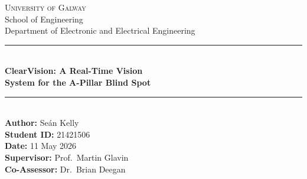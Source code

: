 \documentclass[11pt, a4paper]{report}
\begin{document}
\begin{titlepage}
    \centering
    \vspace*{1.5cm}

    {\Large \textsc{University of Galway}}\\[0.4em]
    {\large School of Engineering}\\[0.3em]
    {\large Department of Electronic and Electrical Engineering}\\[2.8cm]

    \rule{\linewidth}{1pt}\\[0.5em]
    {\LARGE \bfseries ClearVision: A Real-Time Vision\\[0.3em]
    System for the A-Pillar Blind Spot}\\[0.5em]
    \rule{\linewidth}{1pt}\\[2cm]

    {\large \textbf{Author:} Se\'{a}n Kelly}\\[0.4em]
    {\large \textbf{Student ID:} 21421506}\\[0.4em]
    {\large \textbf{Date:} 11 May 2026}\\[0.4em]
    {\large \textbf{Supervisor:} Prof.\ Martin Glavin}\\[0.4em]
    {\large \textbf{Co-Assessor:} Dr.\ Brian Deegan}\\[0.4em]

    \newpage

    \begin{minipage}{0.85\linewidth}
    \begin{abstract}
    \noindent
    The structural A-pillars at the corners of a vehicle's windscreen create
    a persistent blind spot that obstructs the driver's view of the road ahead.
    This report describes ClearVision, a system designed to make this obstruction
    effectively transparent: a display panel mounted in the pillar shows a
    synthesised view of the hidden scene, updated in real time to track the
    driver's head position, so that the panel behaves like a window rather than
    a screen.

    The system captures the scene using a Luxonis OAK-D Lite stereo camera,
    which provides hardware-accelerated depth estimation.
    A viewer-facing USB webcam tracks the driver's head position using a
    lightweight face-mesh pipeline.
    A multi-pass compute shader pipeline on an NVIDIA Jetson Nano then
    reprojects the depth-coloured scene to match the driver's instantaneous
    viewpoint, producing physically-correct motion parallax.

    The project evolved through three development phases, achieving
    25--30~FPS at 640$\times$480 in the final system, compared to
    approximately 5~FPS in the initial prototype.
    Key contributions include a geometrically-correct virtual window
    projection model and a Jump Flood Algorithm hole-fill pass for
    disocclusion regions.
    \end{abstract}
    \end{minipage}
\end{titlepage}
\end{document}
